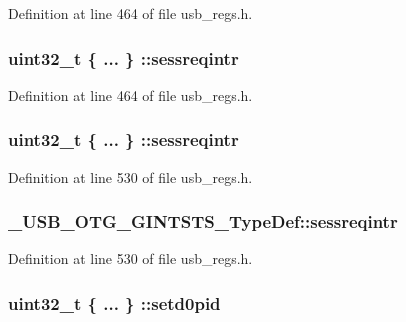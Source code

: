 Definition at line 464 of file usb\-\_\-regs.\-h.

\hypertarget{group___u_s_b___o_t_g___d_r_i_v_e_r_ga7819faff7b2a6ccf166500d9ef378b76}{
\subsubsection[{sessreqintr}]{\setlength{\rightskip}{0pt plus 5cm}uint32\-\_\-t \{ ... \} \-::sessreqintr}}\label{group___u_s_b___o_t_g___d_r_i_v_e_r_ga7819faff7b2a6ccf166500d9ef378b76}


Definition at line 464 of file usb\-\_\-regs.\-h.

\hypertarget{group___u_s_b___o_t_g___d_r_i_v_e_r_gab60a20672cb61f5bccf9f7c2a3cdbc1b}{
\subsubsection[{sessreqintr}]{\setlength{\rightskip}{0pt plus 5cm}uint32\-\_\-t \{ ... \} \-::sessreqintr}}\label{group___u_s_b___o_t_g___d_r_i_v_e_r_gab60a20672cb61f5bccf9f7c2a3cdbc1b}


Definition at line 530 of file usb\-\_\-regs.\-h.

\hypertarget{group___u_s_b___o_t_g___d_r_i_v_e_r_ga181308d74f67372ff71df2d874939732}{
\subsubsection[{sessreqintr}]{ \-\_\-\-U\-S\-B\-\_\-\-O\-T\-G\-\_\-\-G\-I\-N\-T\-S\-T\-S\-\_\-\-Type\-Def\-::sessreqintr}}\label{group___u_s_b___o_t_g___d_r_i_v_e_r_ga181308d74f67372ff71df2d874939732}


Definition at line 530 of file usb\-\_\-regs.\-h.

\hypertarget{group___u_s_b___o_t_g___d_r_i_v_e_r_ga07176630a739be823b83fce16e1de99e}{
\subsubsection[{setd0pid}]{\setlength{\rightskip}{0pt plus 5cm}uint32\-\_\-t \{ ... \} \-::setd0pid}}\label{group___u_s_b___o_t_g___d_r_i_v_e_r_ga07176630a739be823b83fce16e1de99e}


